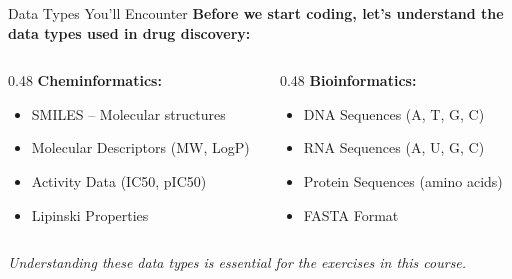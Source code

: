 \documentclass{beamer}
\begin{document}
\begin{frame}{Data Types You'll Encounter}
    \small
    \textbf{Before we start coding, let's understand the data types used in drug discovery:}
    \vspace{0.5em}
    \begin{columns}[T]
        \begin{column}{0.48\textwidth}
            \textbf{Cheminformatics:}
            \begin{itemize}
                \item SMILES -- Molecular structures
                \item Molecular Descriptors (MW, LogP)
                \item Activity Data (IC50, pIC50)
                \item Lipinski Properties
            \end{itemize}
        \end{column}
        \begin{column}{0.48\textwidth}
            \textbf{Bioinformatics:}
            \begin{itemize}
                \item DNA Sequences (A, T, G, C)
                \item RNA Sequences (A, U, G, C)
                \item Protein Sequences (amino acids)
                \item FASTA Format
            \end{itemize}
        \end{column}
    \end{columns}
    \vspace{0.5em}
    \textit{Understanding these data types is essential for the exercises in this course.}
\end{frame}
\end{document}
